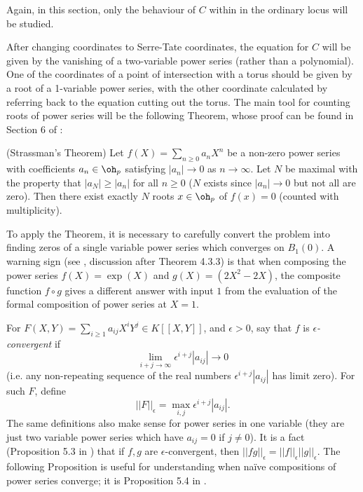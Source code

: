 \documentclass[12pt,letterpaper]{article}
\begin{document}
	Again, in this section, only the behaviour of $C$ within in the ordinary locus will be studied.
	
		After changing coordinates to Serre-Tate coordinates, the equation for $C$ will be given by the vanishing of a two-variable power series (rather than a polynomial). One of the coordinates of a point of intersection with a torus should be given by a root of a 1-variable power series, with the other coordinate calculated by referring back to the equation cutting out the torus. The main tool for counting roots of power series will be the following Theorem, whose proof can be found in Section 6 of \cite{Gou93}:
	
	\begin{thm} (Strassman's Theorem) \label{Strass}
		Let $f(X) = \sum_{n\geq 0} a_nX^n$ be a non-zero power series with coefficients $a_n\in\oh_p$ satisfying $|a_n|\to 0$ as $n\to \infty$. Let $N$ be maximal with the property that $|a_N|\geq |a_n|$ for all $n\geq 0$ ($N$ exists since $|a_n|\to 0$ but not all are zero). Then there exist exactly $N$ roots $x\in \oh_p$ of $f(x)=0$ (counted with multiplicity).
	\end{thm}
	
	To apply the Theorem, it is necessary to carefully convert the problem into finding zeros of a single variable power series which converges on $B_1(0)$. A warning sign (see \cite{Gou93}, discussion after Theorem 4.3.3) is that when composing the power series $f(X) =\exp(X)$ and $g(X)=(2X^2-2X)$, the composite function $f\circ g$ gives a different answer with input $1$ from the evaluation of the formal composition of power series at $X=1$.
	
	
	
	
	
	

	For $F(X,Y)=\sum_{i\geq1} a_{ij}X^iY^j\in K[[X,Y]]$, and $\epsilon>0$, say that $f$ is \textit{$\epsilon$-convergent} if \[\lim_{i+j\to\infty}\epsilon^{i+j}|a_{ij}|\to 0\] (i.e. any non-repeating sequence of the real numbers $\epsilon^{i+j}|a_{ij}|$ has limit zero). For such $F$, define \[||F||_{\epsilon} = \max_{i,j} \epsilon^{i+j}|a_{ij}|.\] The same definitions also make sense for power series in one variable (they are just two variable power series which have $a_{ij}=0$ if $j\ne0$). It is a fact (Proposition 5.3 in \cite{Sch11}) that if $f,g$ are $\epsilon$-convergent, then $||fg||_\epsilon=||f||_\epsilon||g||_\epsilon$. The following Proposition is useful for understanding when na\"ive compositions of power series converge; it is Proposition 5.4 in \cite{Sch11}.
	
\end{document}
